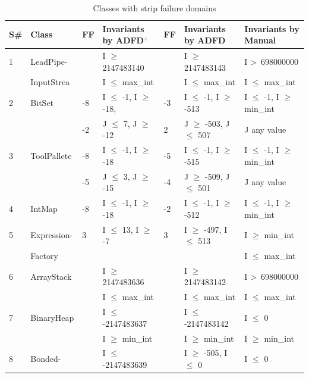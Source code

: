 \clearpage
\newpage
{\scriptsize
\begin{longtable}{|l|l|l|l|l|l|l|}
\caption{Classes with strip failure domains}\\
\hline
S\#  & Class						& FF & Invariants by ADFD$^+$       & FF & Invariants by ADFD     			& Invariants by Manual	\\
  \hline
  \endhead
1	& LeadPipe- 			 		&& I $\ge$ 2147483140			&& I $\ge$ 2147483143			& I \textgreater~698000000					\\ 
	& InputStrea                            && I $\le$ max\_int			  	&& I $\le$ max\_int				& I $\le$ max\_int				\\ 
	\hline
2	& BitSet				  		& -8 & I $\le$ -1, I $\ge$ -18,	&-3 & I $\le$ -1, I $\ge$ -513			& I $\le$ -1, I $\ge$ min\_int	\\ 
	&                                             &-2 & J $\le$ 7, J $\ge$ -12  		& 2 & J $\ge$ -503, J $\le$ 507		& J any value									\\ %
	\hline
3	& ToolPallete			  		&-8 & I $\le$ -1, I $\ge$ -18		&-5 & I $\le$ -1, I $\ge$ -515			& I $\le$ -1, I $\ge$ min\_int	\\ 
	&                                             &-5 & J $\le$ 3, J $\ge$ -15		&-4 & J $\ge$ -509, J $\le$ 501		& J any value			   						\\
	\hline
4	& IntMap			  		&-8 & I $\le$ -1, I $\ge$ -18		&-2 & I $\le$ -1, I $\ge$ -512			& I $\le$ -1, I $\ge$ min\_int	\\
	\hline
5	& Expression-		  		&3 & I $\le$ 13, I $\ge$ -7		& 3 & I $\ge$ -497, I $\le$ 513		& I $\ge$ min\_int 				\\ %
	& Factory                                 &&	 							&&								& I $\le$ max\_int					\\
	\hline
6	& ArrayStack					&& I $\ge$ 2147483636			&& I $\ge$ 2147483142			& I \textgreater~698000000 					\\ 
	&                                             && I $\le$ max\_int		 		&& I $\le$ max\_int					& I $\le$ max\_int 					\\
	\hline
7	& BinaryHeap				&& I $\le$ -2147483637			&& I $\le$ -2147483142			& I $\le$ 0								 \\	
	&                                             && I $\ge$ min\_int				&& I $\ge$ min\_int				& I $\ge$ min\_int				\\
	\hline
8	& Bonded-					&& I $\le$ -2147483639 			&& I $\ge$ -505, I $\le$ 0			& I $\le$ 0 								\\

\end{longtable}}
